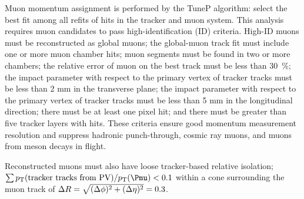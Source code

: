 Muon momentum assignment is performed by the TuneP algorithm: select the best fit among all refits of hits in the tracker and muon system. This analysis requires muon candidates to pass high-\pt identification (ID) criteria. High-\pt ID muons must be reconstructed as global muons; the global-muon track fit must include one or more muon chamber hits; muon segments must be found in two or more chambers; the relative error of muon \pt on the best track must be less than \SI{30}{\%}; the impact parameter with respect to the primary vertex of tracker tracks must be less than 2 mm in the transverse plane; the impact parameter with respect to the primary vertex of tracker tracks must be less than 5 mm in the longitudinal direction; there must be at least one pixel hit; and there must be greater than five tracker layers with hits. These criteria ensure good momentum measurement resolution and suppress hadronic punch-through, cosmic ray muons, and muons from meson decays in flight.

Reconstructed muons must also have loose tracker-based relative isolation; \linebreak $\sum{\pt}(\text{tracker tracks from PV})/\pt(\Pmu) < 0.1$ within a cone surrounding the muon track of $\Delta R = \sqrt{(\Delta \phi )^2 + (\Delta \eta)^2} = 0.3$.